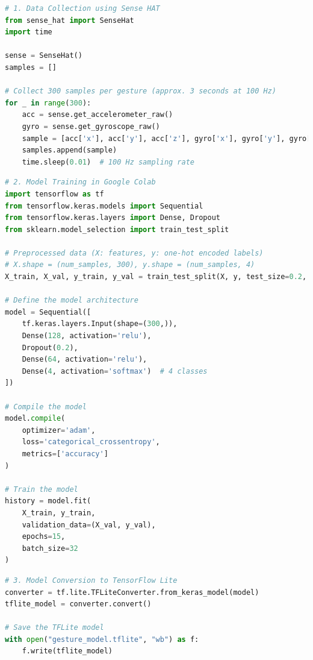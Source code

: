 \documentclass[a4paper,12pt]{article}
\begin{document}
\begin{lstlisting}[language=Python, caption=Sample code for IMU data collection]
# 1. Data Collection using Sense HAT
from sense_hat import SenseHat
import time

sense = SenseHat()
samples = []

# Collect 300 samples per gesture (approx. 3 seconds at 100 Hz)
for _ in range(300):
    acc = sense.get_accelerometer_raw()
    gyro = sense.get_gyroscope_raw()
    sample = [acc['x'], acc['y'], acc['z'], gyro['x'], gyro['y'], gyro['z']]
    samples.append(sample)
    time.sleep(0.01)  # 100 Hz sampling rate
\end{lstlisting}

\begin{lstlisting}[language=Python, caption=Model Training in Google Colab using Dense Neural Network]
# 2. Model Training in Google Colab
import tensorflow as tf
from tensorflow.keras.models import Sequential
from tensorflow.keras.layers import Dense, Dropout
from sklearn.model_selection import train_test_split

# Preprocessed data (X: features, y: one-hot encoded labels)
# X.shape = (num_samples, 300), y.shape = (num_samples, 4)
X_train, X_val, y_train, y_val = train_test_split(X, y, test_size=0.2, random_state=42)

# Define the model architecture
model = Sequential([
    tf.keras.layers.Input(shape=(300,)),
    Dense(128, activation='relu'),
    Dropout(0.2),
    Dense(64, activation='relu'),
    Dense(4, activation='softmax')  # 4 classes
])

# Compile the model
model.compile(
    optimizer='adam',
    loss='categorical_crossentropy',
    metrics=['accuracy']
)

# Train the model
history = model.fit(
    X_train, y_train,
    validation_data=(X_val, y_val),
    epochs=15,
    batch_size=32
)
\end{lstlisting}


\begin{lstlisting}[language=Python, caption=TensorFlow Lite Model Conversion]
# 3. Model Conversion to TensorFlow Lite
converter = tf.lite.TFLiteConverter.from_keras_model(model)
tflite_model = converter.convert()

# Save the TFLite model
with open("gesture_model.tflite", "wb") as f:
    f.write(tflite_model)
\end{lstlisting}
\end{document}
